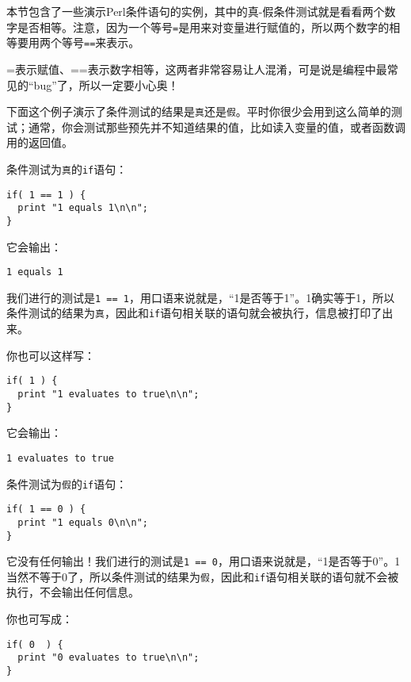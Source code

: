 本节包含了一些演示Perl条件语句的实例，其中的真-假条件测试就是看看两个数字是否相等。注意，因为一个等号\verb|=|是用来对变量进行赋值的，所以两个数字的相等要用两个等号\verb|==|来表示。

\begin{adjustwidth}{2cm}{2cm}
  =表示赋值、==表示数字相等，这两者非常容易让人混淆，可是说是编程中最常见的“bug”了，所以一定要小心奥！
\end{adjustwidth}

下面这个例子演示了条件测试的结果是\verb|真|还是\verb|假|。平时你很少会用到这么简单的测试；通常，你会测试那些预先并不知道结果的值，比如读入变量的值，或者函数调用的返回值。

条件测试为\verb|真|的\verb|if|语句：

\begin{lstlisting}
if( 1 == 1 ) {
  print "1 equals 1\n\n";
}
\end{lstlisting}

它会输出：

\begin{lstlisting}
1 equals 1
\end{lstlisting}

我们进行的测试是\verb|1 == 1|，用口语来说就是，“1是否等于1”。1确实等于1，所以条件测试的结果为\verb|真|，因此和\verb|if|语句相关联的语句就会被执行，信息被打印了出来。

你也可以这样写：

\begin{lstlisting}
if( 1 ) {
  print "1 evaluates to true\n\n";
}
\end{lstlisting}

它会输出：

\begin{lstlisting}
1 evaluates to true
\end{lstlisting}

条件测试为\verb|假|的\verb|if|语句：

\begin{lstlisting}
if( 1 == 0 ) {
  print "1 equals 0\n\n";
}
\end{lstlisting}

它没有任何输出！我们进行的测试是\verb|1 == 0|，用口语来说就是，“1是否等于0”。1当然不等于0了，所以条件测试的结果为\verb|假|，因此和\verb|if|语句相关联的语句就不会被执行，不会输出任何信息。

你也可写成：

\begin{lstlisting}
if( 0  ) {
  print "0 evaluates to true\n\n";
}
\end{lstlisting}

